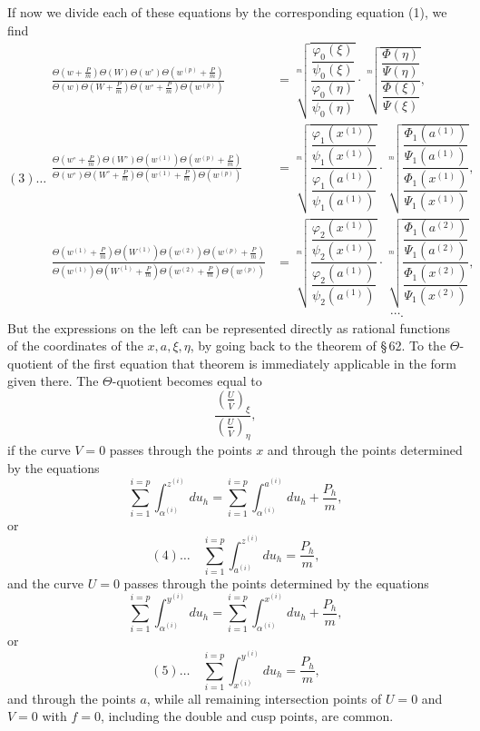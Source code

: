 \documentclass[10pt]{article}
\begin{document}
If now we divide each of these equations by the corresponding equation (1), we find
\[
(3)\ldots
\begin{aligned}
\frac{\Theta\left(w+\frac Pm\right)\Theta(W)\Theta(w^\circ)\Theta\left(w^{(p)}+\frac Pm\right)}
{\Theta(w)\Theta\left(W+\frac Pm\right)\Theta\left(w^\circ+\frac Pm\right)\Theta(w^{(p)})}
&=
\sqrt[m]{\dfrac{\dfrac{\varphi_0(\xi)}{\psi_0(\xi)}}{\dfrac{\varphi_0(\eta)}{\psi_0(\eta)}}}
\cdot
\sqrt[m]{\dfrac{\dfrac{\Phi(\eta)}{\Psi(\eta)}}{\dfrac{\Phi(\xi)}{\Psi(\xi)}}},\\[0.7em]
\frac{\Theta\left(w^\circ+\frac Pm\right)\Theta(W^\circ)\Theta(w^{(1)})\Theta\left(w^{(p)}+\frac Pm\right)}
{\Theta(w^\circ)\Theta\left(W^\circ+\frac Pm\right)\Theta\left(w^{(1)}+\frac Pm\right)\Theta(w^{(p)})}
&=
\sqrt[m]{\dfrac{\dfrac{\varphi_1(x^{(1)})}{\psi_1(x^{(1)})}}{\dfrac{\varphi_1(a^{(1)})}{\psi_1(a^{(1)})}}}
\cdot
\sqrt[m]{\dfrac{\dfrac{\Phi_1(a^{(1)})}{\Psi_1(a^{(1)})}}{\dfrac{\Phi_1(x^{(1)})}{\Psi_1(x^{(1)})}}},\\[0.7em]
\frac{\Theta\left(w^{(1)}+\frac Pm\right)\Theta(W^{(1)})\Theta(w^{(2)})\Theta\left(w^{(p)}+\frac Pm\right)}
{\Theta(w^{(1)})\Theta\left(W^{(1)}+\frac Pm\right)\Theta\left(w^{(2)}+\frac Pm\right)\Theta(w^{(p)})}
&=
\sqrt[m]{\dfrac{\dfrac{\varphi_2(x^{(1)})}{\psi_2(x^{(1)})}}{\dfrac{\varphi_2(a^{(1)})}{\psi_2(a^{(1)})}}}
\cdot
\sqrt[m]{\dfrac{\dfrac{\Phi_1(a^{(2)})}{\Psi_1(a^{(2)})}}{\dfrac{\Phi_1(x^{(2)})}{\Psi_1(x^{(2)})}}},\\
&\hspace{9em}\cdots .
\end{aligned}
\]
But the expressions on the left can be represented directly as rational functions of the coordinates of the \(x,a,\xi,\eta\), by going back to the theorem of \S\,62. To the \(\Theta\)-quotient of the first equation that theorem is immediately applicable in the form given there. The \(\Theta\)-quotient becomes equal to
\[
\frac{\left(\frac{U}{\overline V}\right)_\xi}{\left(\frac{U}{\overline V}\right)_\eta},
\]
if the curve \(V=0\) passes through the points \(x\) and through the points determined by the equations
\[
\sum_{i=1}^{i=p}\int_{\alpha^{(i)}}^{z^{(i)}}du_h
=
\sum_{i=1}^{i=p}\int_{\alpha^{(i)}}^{a^{(i)}}du_h+\frac{P_h}{m},
\]
or
\[
(4)\ldots\quad
\sum_{i=1}^{i=p}\int_{a^{(i)}}^{z^{(i)}}du_h=\frac{P_h}{m},
\]
and the curve \(U=0\) passes through the points determined by the equations
\[
\sum_{i=1}^{i=p}\int_{\alpha^{(i)}}^{y^{(i)}}du_h
=
\sum_{i=1}^{i=p}\int_{\alpha^{(i)}}^{x^{(i)}}du_h+\frac{P_h}{m},
\]
or
\[
(5)\ldots\quad
\sum_{i=1}^{i=p}\int_{x^{(i)}}^{y^{(i)}}du_h=\frac{P_h}{m},
\]
and through the points \(a\), while all remaining intersection points of \(U=0\) and \(V=0\) with \(f=0\), including the double and cusp points, are common.
\end{document}
